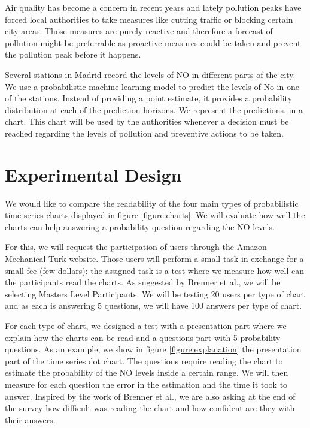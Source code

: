 \documentclass[a4paper,3p,sort&compress]{elsarticle}
\begin{document}
Air quality has become a concern in recent years and lately pollution peaks have forced local authorities to take measures like cutting traffic or blocking certain city areas. Those measures are purely reactive and therefore a forecast of pollution might be preferrable as proactive measures could be taken and prevent the pollution peak before it happens.

Several stations in Madrid record the levels of NO in different parts of the city. We use a probabilistic
machine learning model to predict the levels of No in one of the stations. Instead of providing a point estimate, it provides a 
probability distribution at each of the prediction horizons. We represent the predictions. in a chart. This chart will be used by the
authorities whenever a decision must be reached regarding the levels of pollution and preventive actions to be taken.

\section{Experimental Design}
\label{sec:exp_design}

We would like to compare the readability of the four main types of probabilistic time series charts displayed in figure 
\ref{figure:charts}. We will evaluate how well the charts can help answering a probability question regarding the NO levels.

For this, we will request the participation of users through the Amazon Mechanical Turk website. Those users will perform a small task
in exchange for a small fee (few dollars): the assigned task is a test where we measure how well can the participants read the charts.
As suggested by Brenner et al., we will be selecting Masters Level Participants. We will be testing 20 users per type of chart 
and as each is answering 5 questions, we will have 100 answers per type of chart.

For each type of chart, we designed a test with a presentation part where we explain how the charts can be read and a questions part
with 5 probability questions. As an example, we show in figure \ref{figure:explanation} the presentation part of the time series 
dot chart. The questions
require reading the chart to estimate the probability of the NO levels inside a certain range. We will then measure for each question
the error in the estimation and the time it took to answer. Inspired by the work of Brenner et al., we are also asking at the end of 
the survey how difficult was reading the chart and how confident are they with their answers. 
\end{document}
